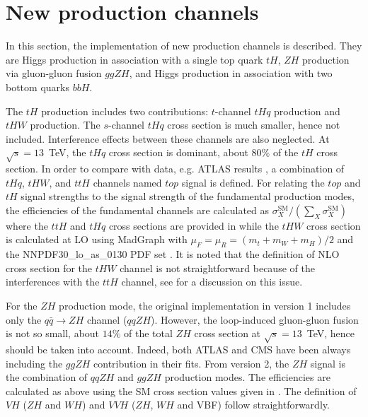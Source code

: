 \clearpage
\section{New production channels} \label{sec:new_production}
In this section, the implementation of new production channels is described. 
They are Higgs production in association with a single top quark $tH$, $ZH$ production via gluon-gluon 
fusion $ggZH$, and Higgs production in association with two bottom quarks $bbH$. 

The $tH$ production includes two contributions: $t$-channel $tHq$ production and $tHW$ production. 
The $s$-channel $tHq$ cross section is much smaller, hence not included. Interference effects between these 
channels are also neglected. At $\sqrt{s} = 13$~TeV, the $tHq$ cross section is dominant, about $80\%$ of the $tH$ cross section. 
In order to compare with data, e.g. ATLAS results \cite{Aaboud:2018xdt}, a combination of $tHq$, $tHW$, and $ttH$ channels named $top$ signal 
is defined. For relating the $top$ and $tH$ signal 
strengths to the signal strength of the fundamental production modes, 
the efficiencies of the fundamental channels are calculated as $\sigma^\text{SM}_X/(\sum_X \sigma^\text{SM}_X)$ where the $ttH$ and $tHq$ cross sections are provided in \cite{deFlorian:2016spz} while the $tHW$ cross section is 
calculated at LO using MadGraph \cite{Alwall:2014hca} with $\mu_F = \mu_R = (m_t + m_W + m_H)/2$ 
and the NNPDF30\_lo\_as\_0130 PDF set \cite{Ball:2014uwa}. It is noted that the definition of NLO cross section for the $tHW$ channel 
is not straightforward because of the interferences with the $ttH$ channel, see \cite{Demartin:2016axk} for a discussion on this issue. 

For the $ZH$ production mode, the original implementation in version 1 includes only the $q\bar{q} \to ZH$ channel ($qqZH$). 
However, the loop-induced gluon-gluon fusion is not so small, about $14\%$ of the total $ZH$ cross section at $\sqrt{s} = 13$~TeV, 
hence should be taken into account. Indeed, both ATLAS and CMS have been always including the $ggZH$ contribution in their fits. 
From version 2, the $ZH$ signal is the combination of $qqZH$ and $ggZH$ production modes. The efficiencies are calculated as above 
using the SM cross section values given in \cite{deFlorian:2016spz}. The definition of $VH$ ($ZH$ and $WH$) and $VVH$ ($ZH$, $WH$ and VBF) 
follow straightforwardly. 

